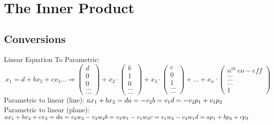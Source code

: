 \documentclass[12pt]{article}
\begin{document}
\section{The Inner Product}
\subsection{Conversions}
Linear Equation To Parametric:\newline\newline
\begin{math}
\ x_{1}=d+bx_{2}+cx_{3}...\Rightarrow
\left ( \begin{matrix}
d\\0\\0\\...\\...
\end{matrix} \right )+x_{2}\cdot
\left ( \begin{matrix}
b\\1\\0\\...\\...
\end{matrix} \right )+x_{3}\cdot
\left ( \begin{matrix}
c\\0\\1\\...\\...
\end{matrix} \right )+...+x_{n}\cdot
\left ( \begin{matrix}
n^{th}\ co-eff\\...\\...\\...\\1
\end{matrix} \right )
\end{math}\newline\newline\newline
Parametric to linear (line):\newline
\begin{math}
ax_{1}+bx_{2}=d\newline
a=-v_{2}\newline
b=v_{1}\newline
d=-v_{2}p_{1}+v_{1}p_{2}
\end{math}\newline\newline
Parametric to linear (plane):\newline
\begin{math}
ax_{1}+bx_{2}+cx_{3}=d\newline
a=v_{2}w_{3}-v_{3}w_{2}\newline
b=v_{3}w_{1}-v_{1}w_{3}\newline
c=v_{1}w_{2}-v_{2}w_{1}\newline
d=ap_{1}+bp_{2}+cp_{3}
\end{math}\newpage
\end{document}
